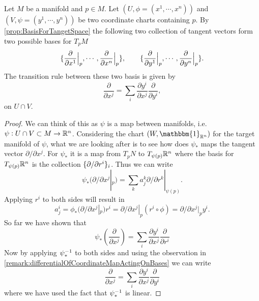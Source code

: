 \begin{proposition}
	Let $ M $ be a manifold and $ p \in M $. Let $ (U,\phi=(x^1,\cdots,x^n)) $ and $ (V,\psi=(y^1,\cdots,y^n)) $ be two coordinate charts containing $ p $. By \autoref{prop:BasisForTangetSpace} the following two collection of tangent vectors form two possible bases for $ T_pM $
	\[ \{ \frac{\partial}{\partial  x^1}\big|_{p}, \cdots, \frac{\partial}{\partial  x^n}\big|_{p} \}, \qquad \{\frac{\partial}{\partial  y^1}\big|_{p},\cdots,\frac{\partial}{\partial  y^n}\big|_{p}\}. \]
	The transition rule between these two basis is given by
	\[ \frac{\partial}{\partial  x^j} = \sum_{i} \frac{\partial y^i}{\partial x^j} \frac{\partial}{\partial y^i},  \]
	on $ U \cap V $.
\end{proposition}
\begin{proof}
	We can think of this as $ \psi $ is a map between manifolds, i.e. $ \psi: U\cap V \subset M \to \mathbb{R}^n $. Considering the chart $ (W,\mathbbm{1}_{\R^n}) $ for the target manifold of $ \psi $, what we are looking after is to see how does $ \psi_* $ maps the tangent vector $ \partial/\partial x^j $. For $ \psi_* $ it is a map from $ T_pN $ to $ T_{\psi(p)}\mathbb{R}^n $ where the basis for $ T_{\psi(p)}\mathbb{R}^n $ is the collection $ \{\partial /\partial r^i\}_i $. Thus we can write
	\[ \psi_*(\partial/\partial x^j|_p) = \sum_k a_j^k \partial/\partial r^k|_{\psi(p)}. \]
	Applying $ r^i $ to both sides will result in 
	\[ a_j^i  =  \phi_*(\partial/\partial x^j|_p) r^i = \partial/\partial x^j|_p (r^i\circ\phi) = \partial/\partial x^j|_p y^i. \]
	So far we have shown that 
	\[ \psi_*(\frac{\partial }{\partial x^j}) = \sum_i \frac{\partial y^i}{\partial x^j}\frac{\partial}{\partial r^i} \]
	Now by applying $ \psi_*^{-1} $ to both sides and using the observation in \autoref{remark:differentialOfCoordinateMapActingOnBases} we can write
	\[ \frac{\partial}{\partial x^j} = \sum_i \frac{\partial y^i}{\partial x^j} \frac{\partial}{\partial y^i} \]
	where we have used the fact that $ \psi^{-1}_* $ is linear.
\end{proof}
